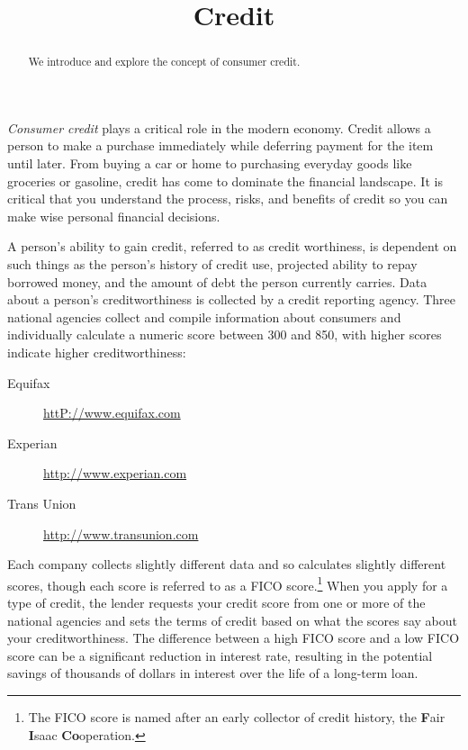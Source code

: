 \documentclass{ximera}
\title{Credit}
\begin{document}
\begin{abstract}
We introduce and explore the concept of consumer credit.
\end{abstract}

\maketitle

\emph{Consumer credit} plays a critical role in the modern economy. Credit allows a person to make a purchase immediately while deferring payment for the item until later. From buying a car or home to purchasing everyday goods like groceries or gasoline, credit has come to dominate the financial landscape. It is critical that you understand the process, risks, and benefits of credit so you can make wise personal financial decisions.

A person's ability to gain credit, referred to as credit worthiness, is dependent on such things as the person's history of credit use, projected ability to repay borrowed money, and the amount of debt the person currently carries. Data about a person's creditworthiness is collected by a credit reporting agency. Three national agencies collect and compile information about consumers and individually calculate a numeric score between 300 and 850, with higher scores indicate higher creditworthiness:
\begin{description}
\item[Equifax] \url{httP://www.equifax.com}
\item[Experian] \url{http://www.experian.com}
\item[Trans Union] \url{http://www.transunion.com}
\end{description}

Each company collects slightly different data and so calculates slightly different scores, though each score is referred to as a FICO score.\footnote{The FICO score is named after an early collector of credit history, the \textbf{F}air \textbf{I}saac \textbf{Co}operation.} When you apply for a type of credit, the lender requests your credit score from one or more of the national agencies and sets the terms of credit based on what the scores say about your creditworthiness. The difference between a high FICO score and a low FICO score can be a significant reduction in interest rate, resulting in the potential savings of thousands of dollars in interest over the life of a long-term loan.
\end{document}
